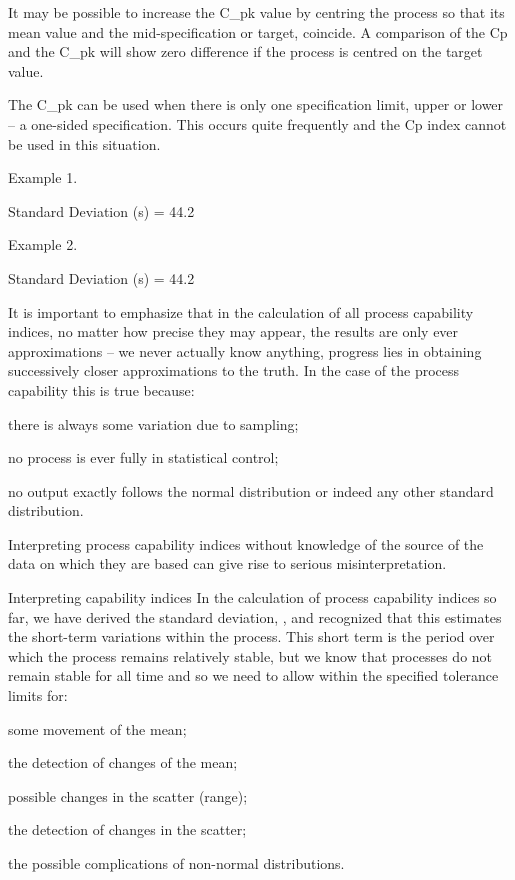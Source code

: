 It may be possible to increase the C_{pk} value by centring the process so that its mean value and the mid-specification or target, coincide. A comparison of the Cp and the C_{pk} will show zero difference if the process is centred on the target value.
 

The C_{pk} can be used when there is only one specification limit, upper or lower – a one-sided specification. This occurs quite frequently and the Cp index cannot be used in this situation.

Example 1.
 
	Standard Deviation (s) = 44.2


 
Example 2.

 
	Standard Deviation (s) = 44.2
 


It is important to emphasize that in the calculation of all process capability indices, no matter how precise they may appear, the results are only ever approximations – we never actually know anything, progress lies in obtaining successively closer approximations to the truth. In the case of the process capability this is true because:

\item	there is always some variation due to sampling;
\item	no process is ever fully in statistical control;
\item	no output exactly follows the normal distribution or indeed any other standard distribution.

Interpreting process capability indices without knowledge of the source of the data on which they are based can give rise to serious misinterpretation.

Interpreting capability indices
In the calculation of process capability indices so far, we have derived the
standard deviation, \sigma, and recognized that this estimates the short-term variations within the process. This short term is the period over which the process remains relatively stable, but we know that processes do not remain stable for all time and so we need to allow within the specified tolerance limits for:

\item	some movement of the mean;
\item	the detection of changes of the mean;
\item	possible changes in the scatter (range);
\item	the detection of changes in the scatter;
\item	the possible complications of non-normal distributions.

